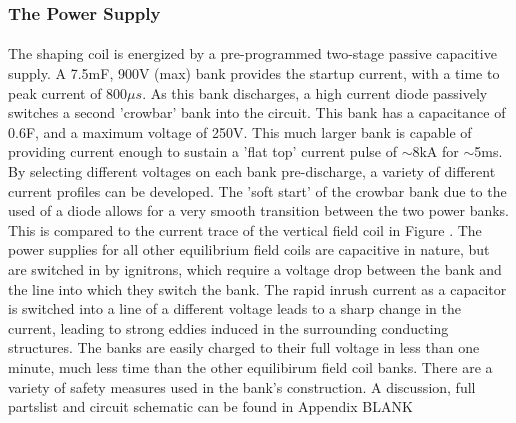 \subsubsection{The Power Supply}
\paragraph{}The shaping coil is energized by a pre-programmed two-stage passive capacitive supply.  A 7.5mF, 900V (max) bank provides the startup current, with a time to peak current of $800\mu s$.  As this bank discharges, a high current diode passively switches a second 'crowbar' bank into the circuit.  This bank has a capacitance of 0.6F, and a maximum voltage of 250V.  This much larger bank is capable of providing current enough to sustain a 'flat top' current pulse of $\sim$8kA for $\sim$5ms.  By selecting different voltages on each bank pre-discharge, a variety of different current profiles can be developed.  The 'soft start' of the crowbar bank due to the used of a diode allows for a very smooth transition between the two power banks.  This is compared to the current trace of the vertical field coil in Figure .  The power supplies for all other equilibrium field coils are capacitive in nature, but are switched in by ignitrons, which require a voltage drop between the bank and the line into which they switch the bank.  The rapid inrush current as a capacitor is switched into a line of a different voltage leads to a sharp change in the current, leading to strong eddies induced in the surrounding conducting structures.  The banks are easily charged to their full voltage in less than one minute, much less time than the other equilibirum field coil banks.  There are a variety of safety measures used in the bank's construction.  A discussion, full partslist and circuit schematic can be found in Appendix BLANK
